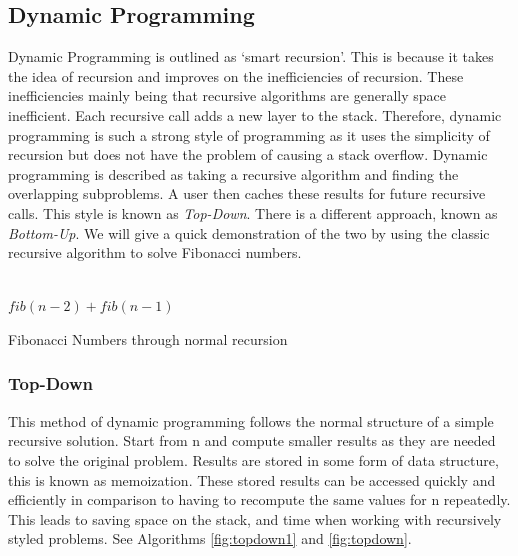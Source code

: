\documentclass[10pt,twocolumn,hidelinks]{IEEEtran}
\begin{document}
\subsection{Dynamic Programming}
Dynamic Programming is outlined as `smart recursion'. This is because it takes the idea of recursion and improves on the inefficiencies of recursion. These inefficiencies mainly being that recursive algorithms are generally space inefficient. Each recursive call adds a new layer to the stack. Therefore, dynamic programming is such a strong style of programming as it uses the simplicity of recursion but does not have the problem of causing a stack overflow. Dynamic programming  is described as taking a recursive algorithm and finding the overlapping subproblems. A user then caches these results for future recursive calls.
This style is known as \textit{Top-Down}. There is a different approach, known as \textit{Bottom-Up}. We will give a quick demonstration of the two by using the classic recursive algorithm to solve Fibonacci numbers.
\IncMargin{1em}
	\begin{algorithm}
	\LinesNumbered
		
		 {\\}
		\Return $fib(n-2) + fib(n-1)$
			
	\caption{Fibonacci Numbers through normal recursion}
	\end{algorithm}
\DecMargin{1em}
	
	\subsubsection{Top-Down}
	This method of dynamic programming follows the normal structure of a simple recursive solution. Start from n and compute smaller results as they are needed to solve the original problem. Results are stored in some form of data structure, this is known as memoization. These stored results can be accessed quickly and efficiently in comparison to having to recompute the same values for n repeatedly. This leads to saving space on the stack, and time when working with recursively styled problems. See Algorithms \ref{fig:topdown1} and \ref{fig:topdown}.
	
\end{document}
